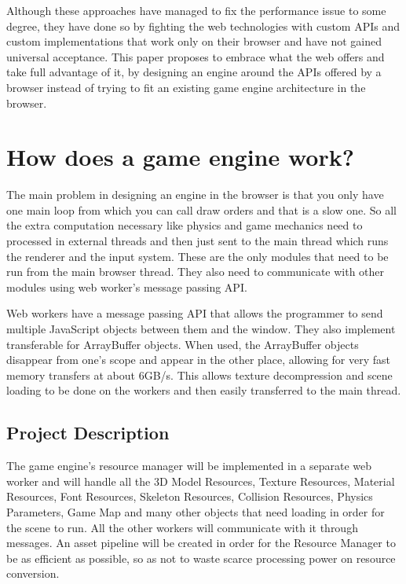 Although these approaches have managed to fix the performance issue to some degree,
they have done so by fighting the web technologies with custom APIs and custom
implementations that work only on their browser and have not gained universal
acceptance. This paper proposes to embrace what the web offers and take full advantage
of it, by designing an engine around the APIs offered by a browser instead of trying to fit an existing game engine architecture in the browser.


\section{How does a game engine work?}
\label{sec:game engine}

The main problem in designing an engine in the browser is that you only have one main
loop from which you can call draw orders and that is a slow one. So all the extra
computation necessary like physics and game mechanics need to processed in external
threads and then just sent to the main thread which runs the renderer and the input
system. These are the only modules that need to be run from the main browser thread.
They also need to communicate with other modules using web worker’s message passing
API.

Web workers have a message passing API that allows the programmer to send multiple
JavaScript objects between them and the window. They also implement transferable for
ArrayBuffer objects. When used, the ArrayBuffer objects disappear from one’s scope and
appear in the other place, allowing for very fast memory transfers at about 6GB/s. This
allows texture decompression and scene loading to be done on the workers and then
easily transferred to the main thread.

\subsection{Project Description}
\label{proj-desc}

The game engine’s resource manager will be implemented in a separate web worker and
will handle all the 3D Model Resources, Texture Resources, Material Resources, Font
Resources, Skeleton Resources, Collision Resources, Physics Parameters, Game Map
and many other objects that need loading in order for the scene to run. All the other
workers will communicate with it through messages. An asset pipeline will be created in
order for the Resource Manager to be as efficient as possible, so as not to waste scarce processing power on resource conversion.

